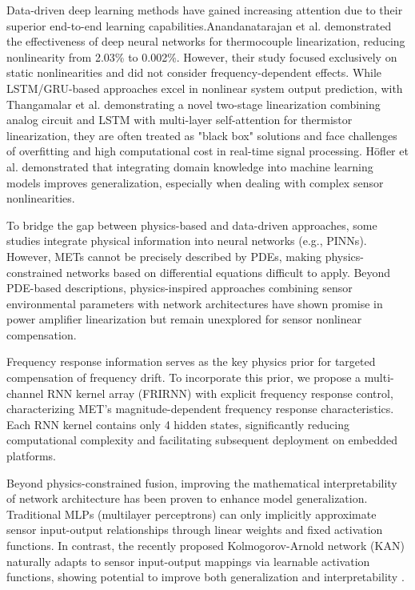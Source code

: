 \documentclass[journal]{IEEEtran}
\begin{document}
    Data-driven deep learning methods have gained increasing attention due to their superior end-to-end learning capabilities.Anandanatarajan et al. \cite{WOS:000913293900084} demonstrated the effectiveness of deep neural networks for thermocouple linearization, reducing nonlinearity from 2.03\% to 0.002\%. However, their study focused exclusively on static nonlinearities and did not consider frequency-dependent effects. While LSTM/GRU-based approaches excel in nonlinear system output prediction\cite{zhaoDetectingEarlyDamages2020}, with Thangamalar et al. \cite{WOS:001399826700001} demonstrating a novel two-stage linearization combining analog circuit and LSTM with multi-layer self-attention for thermistor linearization, they are often treated as "black box" solutions and face challenges of overfitting and high computational cost in real-time signal processing. Höfler et al. \cite{HOFLER2024136528} demonstrated that integrating domain knowledge into machine learning models improves generalization, especially when dealing with complex sensor nonlinearities. 
    
    To bridge the gap between physics-based and data-driven approaches, some studies integrate physical information into neural networks (e.g., PINNs\cite{wangEigenvectorBiasFourier2021}). 
    However, METs cannot be precisely described by PDEs, making physics-constrained networks based on differential equations difficult to apply. Beyond PDE-based descriptions, physics-inspired approaches combining sensor environmental parameters with network architectures\cite{motaqiArtificialIntelligenceBasedPowerTemperature2022} have shown promise in power amplifier linearization but remain unexplored for sensor nonlinear compensation. 
    
    Frequency response information serves as the key physics prior for targeted compensation of frequency drift. To incorporate this prior, we propose a multi-channel RNN kernel array (FRIRNN) with explicit frequency response control, characterizing MET's magnitude-dependent frequency response characteristics. Each RNN kernel contains only 4 hidden states, significantly reducing computational complexity and facilitating subsequent deployment on embedded platforms.

    Beyond physics-constrained fusion, improving the mathematical interpretability of network architecture has been proven to enhance model generalization. Traditional MLPs (multilayer perceptrons) can only implicitly approximate sensor input-output relationships through linear weights and fixed activation functions. In contrast, the recently proposed Kolmogorov-Arnold network (KAN) naturally adapts to sensor input-output mappings via learnable activation functions, showing potential to improve both generalization and interpretability \cite{schmidt-hieberKolmogorovArnoldRepresentation2021, livierisCKANNewApproach2024}. 
\end{document}
